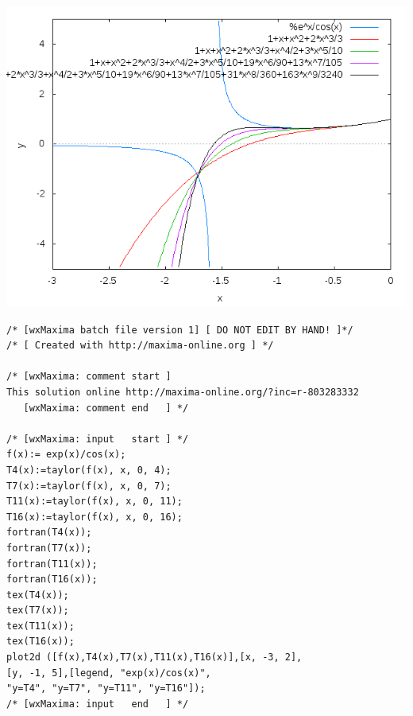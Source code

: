 \documentclass{article}
\begin{document}
\includegraphics[scale=.5]{exp(x)-cos(x)}

\begin{Verbatim}[frame=single]
/* [wxMaxima batch file version 1] [ DO NOT EDIT BY HAND! ]*/
/* [ Created with http://maxima-online.org ] */

/* [wxMaxima: comment start ]
This solution online http://maxima-online.org/?inc=r-803283332
   [wxMaxima: comment end   ] */

/* [wxMaxima: input   start ] */
f(x):= exp(x)/cos(x);
T4(x):=taylor(f(x), x, 0, 4);
T7(x):=taylor(f(x), x, 0, 7);
T11(x):=taylor(f(x), x, 0, 11);
T16(x):=taylor(f(x), x, 0, 16);
fortran(T4(x));
fortran(T7(x));
fortran(T11(x));
fortran(T16(x));
tex(T4(x));
tex(T7(x));
tex(T11(x));
tex(T16(x));
plot2d ([f(x),T4(x),T7(x),T11(x),T16(x)],[x, -3, 2],
[y, -1, 5],[legend, "exp(x)/cos(x)", 
"y=T4", "y=T7", "y=T11", "y=T16"]);
/* [wxMaxima: input   end   ] */
\end{Verbatim}
\end{document}
